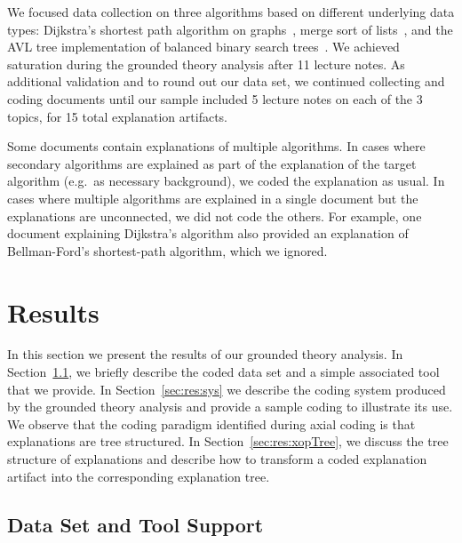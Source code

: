 \documentclass[sigconf]{acmart}
\begin{document}
We focused data collection on three algorithms based on different underlying
data types: Dijkstra's shortest path algorithm on
graphs~\cite[pp.~137--142]{KT06}, merge sort of lists~\cite[210--214]{KT06},
and the AVL tree implementation of balanced binary search
trees~\cite[pp.~458--475]{KnuthArt3}.
%
We achieved saturation during the grounded theory analysis after 11 lecture
notes. As additional validation and to round out our data set, we continued
collecting and coding documents until our sample included 5 lecture notes on
each of the 3 topics, for 15 total explanation artifacts.


Some documents contain explanations of multiple algorithms. In cases where
secondary algorithms are explained as part of the explanation of the target
algorithm (e.g.\ as necessary background), we coded the explanation as usual.
In cases where multiple algorithms are explained in a single document but the
explanations are unconnected, we did not code the others. For example, one
document explaining Dijkstra's algorithm also provided an explanation of
Bellman-Ford's shortest-path algorithm, which we ignored.





\section{Results}
\label{sec:res}

In this section we present the results of our grounded theory analysis.
%
In Section~\ref{sec:res:data}, we briefly describe the coded data set and a
simple associated tool that we provide.
%
In Section~\ref{sec:res:sys} we describe the coding system produced by the
grounded theory analysis and provide a sample coding to illustrate its use. We
observe that the coding paradigm identified during axial coding is that
explanations are tree structured.
%
In Section~\ref{sec:res:xopTree}, we discuss the tree structure of explanations
and describe how to transform a coded explanation artifact into the
corresponding explanation tree.


\subsection{Data Set and Tool Support}
\label{sec:res:data}
\end{document}
